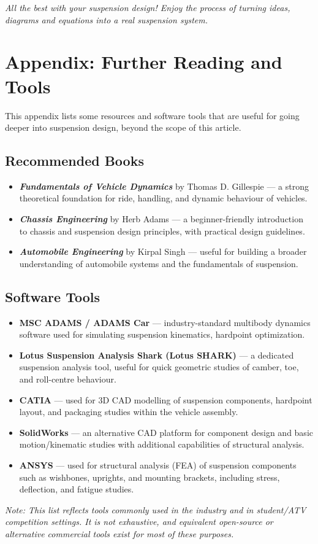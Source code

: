 \documentclass[12pt,a4paper]{article}
\begin{document}
\textit{All the best with your suspension design! Enjoy the process of turning ideas, diagrams and equations into a real suspension system.}

\appendix
\section{Appendix: Further Reading and Tools}

This appendix lists some resources and software tools that are useful for going deeper into suspension design, beyond the scope of this article.

\subsection*{Recommended Books}

\begin{itemize}
    \item \textbf{\textit{Fundamentals of Vehicle Dynamics}} by Thomas D. Gillespie --- a strong theoretical foundation for ride, handling, and dynamic behaviour of vehicles.
    \item \textbf{\textit{Chassis Engineering}} by Herb Adams --- a beginner-friendly introduction to chassis and suspension design principles, with practical design guidelines.
    \item \textbf{\textit{Automobile Engineering}} by Kirpal Singh --- useful for building a broader understanding of automobile systems and the fundamentals of suspension.
\end{itemize}

\subsection*{Software Tools}

\begin{itemize}
    \item \textbf{MSC ADAMS / ADAMS Car} --- industry-standard multibody dynamics software used for simulating suspension kinematics, hardpoint optimization.
    \item \textbf{Lotus Suspension Analysis Shark (Lotus SHARK)} --- a dedicated suspension analysis tool, useful for quick geometric studies of camber, toe, and roll-centre behaviour.
    \item \textbf{CATIA} --- used for 3D CAD modelling of suspension components, hardpoint layout, and packaging studies within the vehicle assembly.
    \item \textbf{SolidWorks} --- an alternative CAD platform for component design and basic motion/kinematic studies with additional capabilities of structural analysis.
    \item \textbf{ANSYS} --- used for structural analysis (FEA) of suspension components such as wishbones, uprights, and mounting brackets, including stress, deflection, and fatigue studies.
\end{itemize}

\textit{Note: This list reflects tools commonly used in the industry and in student/ATV competition settings. It is not exhaustive, and equivalent open-source or alternative commercial tools exist for most of these purposes.}
\end{document}
